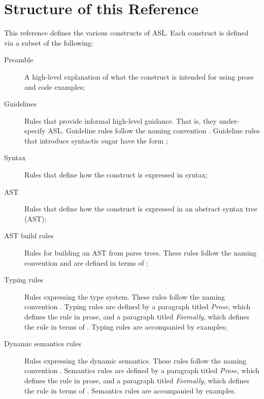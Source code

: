 
\section{Structure of this Reference}
This reference defines the various constructs of ASL.
Each construct is defined via a subset of the following:
\begin{description}
    \item[Preamble] A high-level explanation of what the construct is intended for using
        prose and code examples;
    \item[Guidelines] Rules that provide informal high-level guidance.
        That is, they under-specify ASL.
        Guideline rules follow the naming convention .
        Guideline rules that introduce syntactic sugar have the form ;
    \item[Syntax] Rules that define how the construct is expressed in syntax;
    \item[AST] Rules that define how the construct is expressed in an abstract syntax tree (AST);
    \item[AST build rules] Rules for building an AST from parse trees.
        These rules follow the naming convention 
        and are defined in terms of \inferencerules;
    \item[Typing rules] Rules expressing the type system.
        These rules follow the naming convention .
        Typing rules are defined by a paragraph titled \emph{Prose},
        which defines the rule in prose,
        and a paragraph titled \emph{Formally}, which defines the rule in terms of \inferencerules.
        Typing rules are accompanied by examples;
    \item[Dynamic semantics rules] Rules expressing the dynamic semantics.
        These rules follow the naming convention .
        Semantics rules are defined by a paragraph titled \emph{Prose},
        which defines the rule in prose,
        and a paragraph titled \emph{Formally}, which defines the rule in terms of \inferencerules.
        Semantics rules are accompanied by examples.
\end{description}

